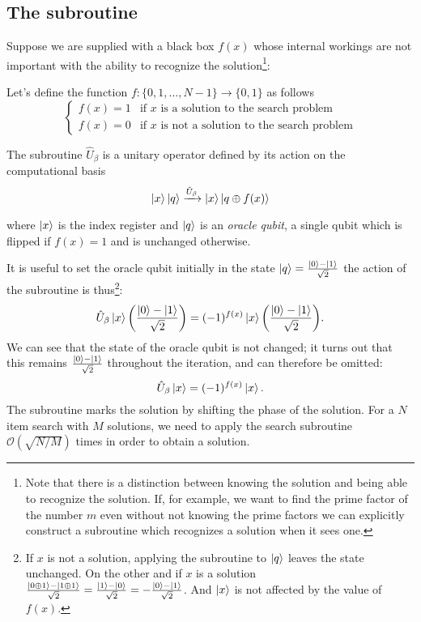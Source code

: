 \subsection{The subroutine}\label{sec:subroutine}
Suppose we are supplied with a black box $f(x)$ whose internal workings are not important with the ability to recognize the solution\footnote{Note that there is a distinction between knowing the solution and being able to recognize the solution. If, for example, we want to find the prime factor of the number $m$ even without not knowing the prime factors we can explicitly construct a subroutine which recognizes a solution when it sees one.}:
\begin{defn}
Let's define the function $f: \{0,1,...,N-1\} \rightarrow \{0,1\}$ as follows
\begin{equation*}
    \begin{cases}
f(x) = 1  & \text{if $x$ is a solution to the search problem} \\
f(x) = 0 & \text{if $x$ is not a solution to the search problem} 
\end{cases}
\end{equation*}
\end{defn}
\begin{defn}
The subroutine $\hat{U}_\beta$ is a unitary operator defined by its action on the computational basis
\begin{equation*}
    \ket{x}\ket{q} \xrightarrow{\hat{U}_\beta} \ket{x} \ket{q \oplus f(x)}
\end{equation*}
\end{defn}
where $\ket{x}$ is the index register and $\ket{q}$ is an \emph{oracle qubit}, a single qubit which is flipped if $f(x) = 1$ and is unchanged otherwise.

It is useful to set the oracle qubit initially in the state $\ket{q} = \frac{\ket{0}-\ket{1}}{\sqrt{2}}$ the action of the subroutine is thus\footnote{If $x$ is not a solution, applying the subroutine to $\ket{q}$ leaves the state unchanged. On the other and if $x$ is a solution $\frac{\ket{0 \oplus 1} - \ket{1 \oplus 1}}{\sqrt{2}} = \frac{\ket{1}-\ket{0}}{\sqrt{2}} = - \frac{\ket{0}-\ket{1}}{\sqrt{2}}$. And $\ket{x}$ is not affected by the value of $f(x)$.}:
\begin{equation*}
    \hat{U}_\beta \ket{x} \biggl(\frac{\ket{0}-\ket{1}}{\sqrt{2}}\biggr) = (-1)^{f(x)} \ket{x} \biggl(\frac{\ket{0}-\ket{1}}{\sqrt{2}}\biggr).
\end{equation*}
We can see that the state of the oracle qubit is not changed; it turns out that this remains  $\frac{\ket{0}-\ket{1}}{\sqrt{2}}$ throughout the iteration, and can therefore be omitted:
\begin{equation*}
    \hat{U}_\beta \ket{x} = (-1)^{f(x)} \ket{x}.
\end{equation*}
The subroutine marks the solution by shifting the phase of the solution. For a $N$ item search with $M$ solutions, we need to apply the search subroutine $\mathcal{O}(\sqrt{N/M})$ times in order to obtain a solution.

